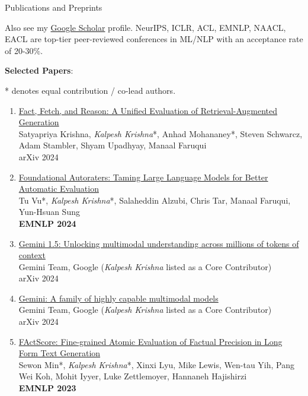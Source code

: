 \documentclass{resume} %
\begin{document}
\begin{rSection}{Publications and Preprints}
\vspace*{0.1in}

Also see my \href{https://scholar.google.com/citations?hl=en&user=9g2BsMUAAAAJ}{Google Scholar} profile. NeurIPS, ICLR, ACL, EMNLP, NAACL, EACL are top-tier peer-reviewed conferences in ML/NLP with an acceptance rate of  20-30\%.

\vspace{0.05in}

\textbf{Selected Papers}:

* denotes equal contribution / co-lead authors.

\begin{enumerate}[leftmargin=*]
\setlength\itemsep{0.4em}

\item \href{https://arxiv.org/abs/2409.12941}{Fact, Fetch, and Reason: A Unified Evaluation of Retrieval-Augmented Generation} \\
Satyapriya Krishna, \emph{Kalpesh Krishna}*, Anhad Mohananey*, Steven Schwarcz, Adam Stambler, Shyam Upadhyay, Manaal Faruqui\\
arXiv 2024

\item \href{https://arxiv.org/abs/2407.10817}{Foundational Autoraters: Taming Large Language Models for Better Automatic Evaluation} \\
Tu Vu*, \emph{Kalpesh Krishna}*, Salaheddin Alzubi, Chris Tar, Manaal Faruqui, Yun-Hsuan Sung \\
\textbf{EMNLP 2024}

\item \href{https://storage.googleapis.com/deepmind-media/gemini/gemini_v1_5_report.pdf}{Gemini 1.5: Unlocking multimodal understanding across millions of tokens of context} \\
Gemini Team, Google (\emph{Kalpesh Krishna} listed as a Core Contributor) \\
arXiv 2024

\item \href{https://storage.googleapis.com/deepmind-media/gemini/gemini_1_report.pdf}{Gemini: A family of highly capable multimodal models} \\
Gemini Team, Google (\emph{Kalpesh Krishna} listed as a Core Contributor) \\
arXiv 2024

\item \href{https://arxiv.org/abs/2305.14251}{FActScore: Fine-grained Atomic Evaluation of Factual Precision in Long Form Text Generation} \\
Sewon Min*, \emph{Kalpesh Krishna}*, Xinxi Lyu, Mike Lewis, Wen-tau Yih, Pang Wei Koh, Mohit Iyyer, Luke Zettlemoyer, Hannaneh Hajishirzi \\
\textbf{EMNLP 2023}


\end{enumerate}
\end{rSection}
\end{document}
